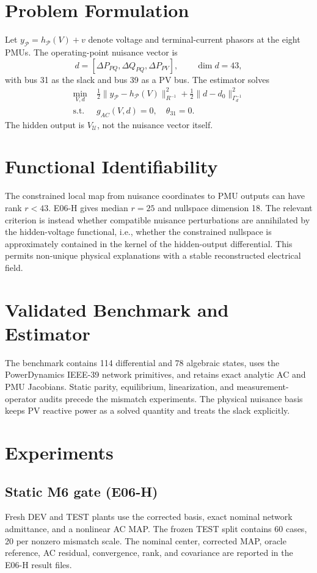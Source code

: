 \documentclass[journal]{IEEEtran}
\begin{document}
\section{Problem Formulation}
Let $y_{\mathcal P}=h_{\mathcal P}(V)+v$ denote voltage and terminal-current
phasors at the eight PMUs. The operating-point nuisance vector is
\[
d=[\Delta P_{PQ},\Delta Q_{PQ},\Delta P_{PV}],\qquad \dim d=43,
\]
with bus 31 as the slack and bus 39 as a PV bus. The estimator solves
\begin{align}
\min_{V,d}\;&\tfrac12\|y_{\mathcal P}-h_{\mathcal P}(V)\|_{R^{-1}}^2
 +\tfrac12\|d-d_0\|_{\Gamma_d^{-1}}^2\\
\text{s.t. }&g_{AC}(V,d)=0,\quad \theta_{31}=0.
\end{align}
The hidden output is $V_{\mathcal U}$, not the nuisance vector itself.

\section{Functional Identifiability}
The constrained local map from nuisance coordinates to PMU outputs can have
rank $r<43$. E06-H gives median $r=25$ and nullspace dimension 18. The relevant
criterion is instead whether compatible nuisance perturbations are annihilated
by the hidden-voltage functional, i.e., whether the constrained nullspace is
approximately contained in the kernel of the hidden-output differential.
This permits non-unique physical explanations with a stable reconstructed
electrical field.

\section{Validated Benchmark and Estimator}
The benchmark contains 114 differential and 78 algebraic states, uses the
PowerDynamics IEEE-39 network primitives, and retains exact analytic AC and PMU
Jacobians. Static parity, equilibrium, linearization, and measurement-operator
audits precede the mismatch experiments. The physical nuisance basis keeps PV
reactive power as a solved quantity and treats the slack explicitly.

\section{Experiments}
\subsection{Static M6 gate (E06-H)}
Fresh DEV and TEST plants use the corrected basis, exact nominal network
admittance, and a nonlinear AC MAP. The frozen TEST split contains 60 cases,
20 per nonzero mismatch scale. The nominal center, corrected MAP, oracle
reference, AC residual, convergence, rank, and covariance are reported in the
E06-H result files.
\end{document}
